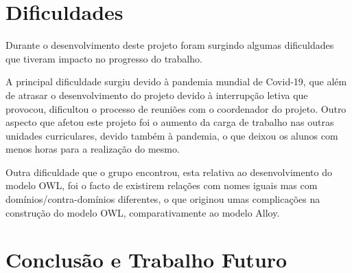 \documentclass{article}
\begin{document}
\newpage
\section{Dificuldades}

\par Durante o desenvolvimento deste projeto foram surgindo algumas dificuldades que tiveram impacto no progresso do trabalho.
\par A principal dificuldade surgiu devido à pandemia mundial de Covid-19, que além de atrasar o desenvolvimento do projeto devido à interrupção letiva que provocou, dificultou o processo de reuniões com o coordenador do projeto. Outro aspecto que afetou este projeto foi o aumento da carga de trabalho nas outras unidades curriculares, devido também à pandemia, o que deixou os alunos com menos horas para a realização do mesmo.
\par Outra dificuldade que o grupo encontrou, esta relativa ao desenvolvimento do modelo OWL, foi o facto de existirem relações com nomes iguais mas com domínios/contra-domínios diferentes, o que originou umas complicações na construção do modelo OWL, comparativamente ao modelo Alloy.

\newpage
\section{Conclusão e Trabalho Futuro}

\end{document}
